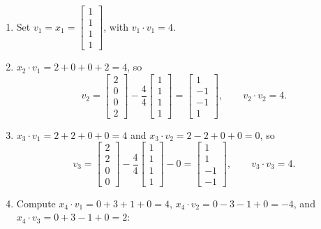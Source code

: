 \documentclass[11pt, letterpaper]{article}
\theoremstyle{definition}
\theoremstyle{remark}
\begin{document}
\begin{enumerate}[label=\textbf{Step \arabic*:}]
    \item Set $v_1 = x_1 = \begin{bmatrix} 1 \\ 1 \\ 1 \\ 1 \end{bmatrix}$, with $v_1 \cdot v_1 = 4$.
    \item $x_2 \cdot v_1 = 2 + 0 + 0 + 2 = 4$, so
    \[
        v_2 = \begin{bmatrix} 2 \\ 0 \\ 0 \\ 2 \end{bmatrix} - \frac{4}{4}\begin{bmatrix} 1 \\ 1 \\ 1 \\ 1 \end{bmatrix} = \begin{bmatrix} 1 \\ -1 \\ -1 \\ 1 \end{bmatrix}, \qquad v_2 \cdot v_2 = 4.
    \]
    \item $x_3 \cdot v_1 = 2 + 2 + 0 + 0 = 4$ and $x_3 \cdot v_2 = 2 - 2 + 0 + 0 = 0$, so
    \[
        v_3 = \begin{bmatrix} 2 \\ 2 \\ 0 \\ 0 \end{bmatrix} - \frac{4}{4}\begin{bmatrix} 1 \\ 1 \\ 1 \\ 1 \end{bmatrix} - 0 = \begin{bmatrix} 1 \\ 1 \\ -1 \\ -1 \end{bmatrix}, \qquad v_3 \cdot v_3 = 4.
    \]
    \item Compute $x_4 \cdot v_1 = 0 + 3 + 1 + 0 = 4$, $x_4 \cdot v_2 = 0 - 3 - 1 + 0 = -4$, and $x_4 \cdot v_3 = 0 + 3 - 1 + 0 = 2$:
    \[
\]
\end{enumerate}
\end{document}
